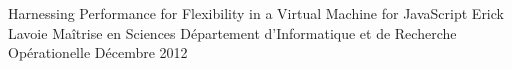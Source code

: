 \documentclass[letterpaper,9pt]{report}
\begin{document}

\thesistitle
	{Harnessing Performance for Flexibility in a Virtual Machine for JavaScript}
	{Erick Lavoie}
	{Maîtrise en Sciences}
	{D\'epartement d'Informatique et de Recherche Op\'erationelle}
	{Décembre 2012}

%

%
%















% 
\end{document}
